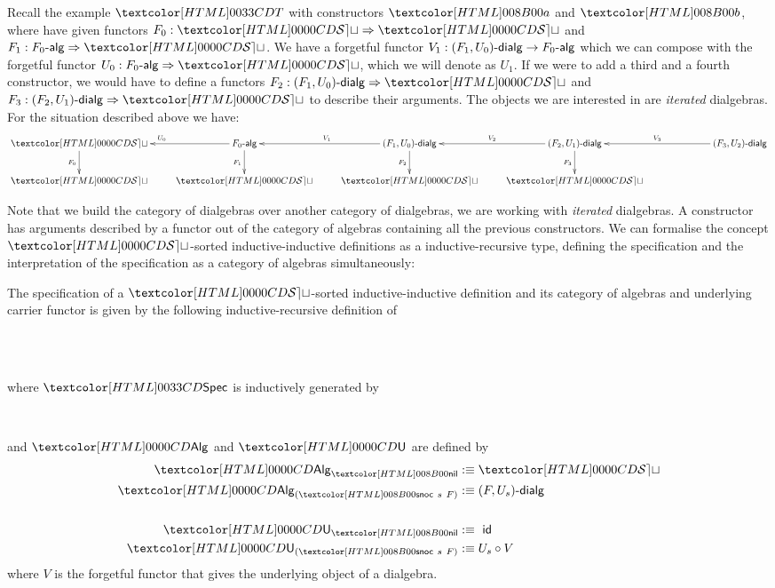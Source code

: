 Recall the example $\Tty$ with constructors $\Ta$ and $\Tb$, where
have given functors $F_0 : \Func{\SET}{\SET}$ and
$F_1 : \Func{\algcat{F_0}}{\SET}$. We have a forgetful functor
$V_1 : \dialgcat{F_1}{U_0} \to \algcat{F_0}$ which we can compose with
the forgetful functor $U_0 : \Func{\algcat{F_0}}{\SET}$, which we will
denote as $U_1$. If we were to add a third and a fourth constructor,
we would have to define a functors
$F_2 : \Func{\dialgcat{F_1}{U_0}}{\SET}$ and
$F_3 : \Func{\dialgcat{F_2}{U_1}}{\SET}$ to describe their arguments. The
objects we are interested in are \emph{iterated} dialgebras. For the
situation described above we have:
$$
\xymatrix@!C{
\SET 
\ar[d]_{F_0}
&\algcat{F_0} 
\ar[d]_{F_1}
\ar[l]_{U_0}
&\dialgcat{F_1}{U_0}
\ar[d]_{F_2}
\ar[l]_{V_1}
&\dialgcat{F_2}{U_1}
\ar[d]_{F_3}
\ar[l]_{V_2}
&\dialgcat{F_3}{U_2}
\ar[l]_{V_3}
\\
\SET
&\SET
&\SET
&\SET
&
}
$$

Note that we build the category of dialgebras over another category of
dialgebras, \ie we are working with \emph{iterated} dialgebras. A
constructor has arguments described by a functor out of the category
of algebras containing all the previous constructors. We can formalise
the concept $\SET$-sorted inductive-inductive definitions as a
inductive-recursive type, defining the specification and the
interpretation of the specification as a category of algebras
simultaneously:
%
\begin{definition}
  \label{type-sorted-spec}
  The specification of a $\SET$-sorted inductive-inductive definition
  and its category of algebras and underlying carrier functor is given
  by the following inductive-recursive
  definition of
  \begin{sorts}
    \sortnamety{\specty}{\Set} \\
    \functy{\Alg}{\specty \to \Cat} \\
  \end{sorts}
  where $\specty$ is inductively generated by
  \begin{datatype}{\specty}{}
    \constr{\specnil}{\specty} \\
  \end{datatype}
  and $\Alg$ and $\Und$ are defined by
  \begin{align*}
    \Alg_{\specnil} &\ddefeq \SET \\
    \Alg_{(\specsnoc\ s\ F)} &\ddefeq \dialgcat{F}{U_s} \\
    \\
    \Und_{\specnil} &\ddefeq\ \id \\
    \Und_{(\specsnoc\ s\ F)} &\ddefeq U_s \circ V
  \end{align*}
  where $V$ is the forgetful functor that gives the underlying object of
  a dialgebra.
\end{definition}

